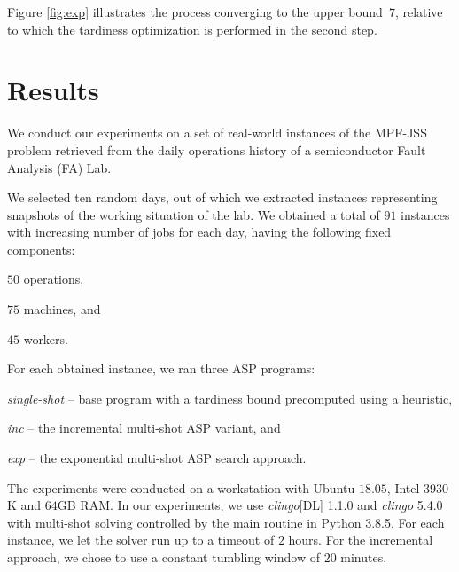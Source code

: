 \documentclass[submission,copyright,creativecommons]{eptcs}
\newcommand{\jss}{MPF-JSS\xspace}
\begin{document}
Figure \ref{fig:exp} illustrates the process converging to the upper bound~$7$,
relative to which the tardiness optimization is performed in the second step.

\section{Results}

We conduct our experiments on a set of real-world instances of the \jss problem retrieved from the daily operations history of a semiconductor Fault Analysis (FA) Lab.%

We selected ten random days, out of which we extracted instances representing snapshots of the working situation of the lab. We obtained a total of $91$ instances with increasing number of jobs for each day, having the following fixed components:
\begin{enumerate*}[label=\emph{(\roman*)}]
	\item $50$ operations,
	\item $75$ machines, and 
	\item $45$ workers.
\end{enumerate*}
For each obtained instance, we ran three ASP programs: 
\begin{enumerate*}[label=\emph{(\roman*)}]	
	\item \emph{single-shot} -- base program with a tardiness bound precomputed using a heuristic,
	\item \emph{inc} -- the incremental multi-shot ASP variant, and 
	\item \emph{exp} -- the exponential multi-shot ASP search approach.
\end{enumerate*}
The experiments were conducted on a workstation with Ubuntu $18.05$, Intel  $3930$K and $64$GB RAM. In our experiments, we use \emph{clingo}[DL] 1.1.0 and \emph{clingo} 5.4.0 with multi-shot solving controlled by the main routine in Python 3.8.5. For each instance, we let the solver run up to a timeout of $2$ hours. For the incremental approach, we chose to use a constant tumbling window of $20$ minutes.
\end{document}
